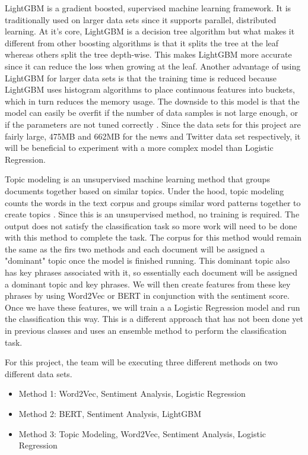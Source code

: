 \documentclass[conference]{IEEEtran}
\begin{document}
LightGBM is a gradient boosted, supervised machine learning framework. It is traditionally used on larger data sets since it supports parallel, distributed learning. At it's core, LightGBM is a decision tree algorithm but what makes it different from other boosting algorithms is that it splits the tree at the leaf whereas others split the tree depth-wise. This makes LightGBM more accurate since it can reduce the loss when growing at the leaf. Another advantage of using LightGBM for larger data sets is that the training time is reduced because LightGBM uses histogram algorithms to place continuous features into buckets, which in turn reduces the memory usage. The downside to this model is that the model can easily be overfit if the number of data samples is not large enough, or if the parameters are not tuned correctly \cite{b12}. Since the data sets for this project are fairly large, 475MB and 662MB for the news and Twitter data set respectively, it will be beneficial to experiment with a more complex model than Logistic Regression.

Topic modeling is an unsupervised machine learning method that groups documents together based on similar topics. Under the hood, topic modeling counts the words in the text corpus and groups similar word patterns together to create topics \cite{b5}. Since this is an unsupervised method, no training is required. The output does not satisfy the classification task so more work will need to be done with this method to complete the task. The corpus for this method would remain the same as the firs two methods and each document will be assigned a "dominant" topic once the model is finished running. This dominant topic also has key phrases associated with it, so essentially each document will be assigned a dominant topic and key phrases. We will then create features from these key phrases by using Word2Vec or BERT in conjunction with the sentiment score. Once we have these features, we will train a a Logistic Regression model and run the classification this way. This is a different approach that has not been done yet in previous classes and uses an ensemble method to perform the classification task.

For this project, the team will be executing three different methods on two different data sets.
\begin{itemize}
    \item Method 1: Word2Vec, Sentiment Analysis, Logistic Regression
    \item Method 2: BERT, Sentiment Analysis, LightGBM
    \item Method 3: Topic Modeling, Word2Vec, Sentiment Analysis, Logistic Regression
\end{itemize}
\end{document}
